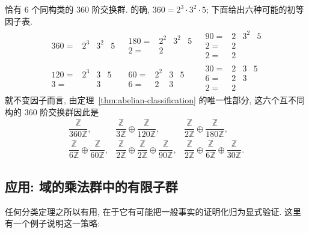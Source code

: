 \begin{example}
\label{ex:abelian-order-360}
恰有 $6$ 个同构类的 $360$ 阶交换群. 的确, $360 = 2^3 \cdot 3^2 \cdot 5$; 下面给出六种可能的初等因子表.
\[
\begin{array}{ccc}
\begin{array}{r|ccc}360=&2^3&3^2&5\end{array}&
\begin{array}{r|ccc}180=&2^2&3^2&5\\2=&2&&\end{array}&
\begin{array}{r|ccc}90=&2&3^2&5\\2=&2&&\\2=&2&&\end{array}\\[12pt]
\begin{array}{r|ccc}120=&2^3&3&5\\3=&&3&\end{array}&
\begin{array}{r|ccc}60=&2^2&3&5\\6=&2&3&\end{array}&
\begin{array}{r|ccc}30=&2&3&5\\6=&2&3&\\2=&2&&\end{array}
\end{array}
\]
就不变因子而言, 由定理~\ref{thm:abelian-classification} 的唯一性部分, 这六个互不同构的 $360$ 阶交换群因此是
\[
\begin{array}{ccc}
\dfrac{\mathbb{Z}}{360\mathbb{Z}}, & \dfrac{\mathbb{Z}}{3\mathbb{Z}} \oplus \dfrac{\mathbb{Z}}{120\mathbb{Z}}, & \dfrac{\mathbb{Z}}{2\mathbb{Z}} \oplus \dfrac{\mathbb{Z}}{180\mathbb{Z}}, \\[6pt]
\dfrac{\mathbb{Z}}{6\mathbb{Z}} \oplus \dfrac{\mathbb{Z}}{60\mathbb{Z}}, & \dfrac{\mathbb{Z}}{2\mathbb{Z}} \oplus \dfrac{\mathbb{Z}}{2\mathbb{Z}} \oplus \dfrac{\mathbb{Z}}{90\mathbb{Z}}, & \dfrac{\mathbb{Z}}{2\mathbb{Z}} \oplus \dfrac{\mathbb{Z}}{6\mathbb{Z}} \oplus \dfrac{\mathbb{Z}}{30\mathbb{Z}}.
\end{array}
\]
\end{example}

\subsection{应用: 域的乘法群中的有限子群}
\label{subsec:fag-application}

任何分类定理之所以有用, 在于它有可能把一般事实的证明化归为显式验证. 这里有一个例子说明这一策略:


